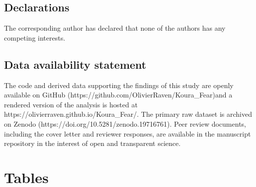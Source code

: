 \documentclass[
  12pt,
  a4paper,
]{scrbook}
\newcounter{none} %
\begin{document}
\section{Declarations}\label{declarations}

The corresponding author has declared that none of the authors has any
competing interests.

\section{Data availability statement}\label{data-availability-statement}

The code and derived data supporting the findings of this study are
openly available on GitHub
(https://github.com/OlivierRaven/Koura\_Fear)and a rendered version of
the analysis is hosted at https://olivierraven.github.io/Koura\_Fear/.
The primary raw dataset is archived on Zenodo
(https://doi.org/10.5281/zenodo.19716761). Peer review documents,
including the cover letter and reviewer responses, are available in the
manuscript repository in the interest of open and transparent science.


\chapter{Tables}\label{tables}
\end{document}

